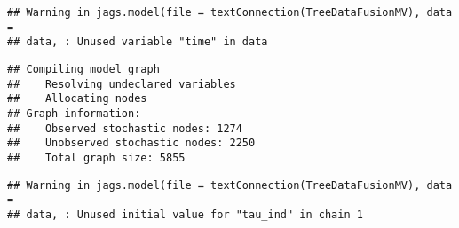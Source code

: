 \documentclass[]{article}
\newenvironment{Shaded}{\begin{snugshade}}{\end{snugshade}}
\newcommand{\CommentTok}[1]{\textcolor[rgb]{0.56,0.35,0.01}{\textit{#1}}}
\newcommand{\ControlFlowTok}[1]{\textcolor[rgb]{0.13,0.29,0.53}{\textbf{#1}}}
\newcommand{\DataTypeTok}[1]{\textcolor[rgb]{0.13,0.29,0.53}{#1}}
\newcommand{\DecValTok}[1]{\textcolor[rgb]{0.00,0.00,0.81}{#1}}
\newcommand{\KeywordTok}[1]{\textcolor[rgb]{0.13,0.29,0.53}{\textbf{#1}}}
\newcommand{\NormalTok}[1]{#1}
\newcommand{\OperatorTok}[1]{\textcolor[rgb]{0.81,0.36,0.00}{\textbf{#1}}}
\newcommand{\OtherTok}[1]{\textcolor[rgb]{0.56,0.35,0.01}{#1}}
\newcommand{\StringTok}[1]{\textcolor[rgb]{0.31,0.60,0.02}{#1}}
\begin{document}
\begin{Shaded}
\end{Shaded}

\begin{verbatim}
## Warning in jags.model(file = textConnection(TreeDataFusionMV), data =
## data, : Unused variable "time" in data
\end{verbatim}

\begin{verbatim}
## Compiling model graph
##    Resolving undeclared variables
##    Allocating nodes
## Graph information:
##    Observed stochastic nodes: 1274
##    Unobserved stochastic nodes: 2250
##    Total graph size: 5855
\end{verbatim}

\begin{verbatim}
## Warning in jags.model(file = textConnection(TreeDataFusionMV), data =
## data, : Unused initial value for "tau_ind" in chain 1
\end{verbatim}
\end{document}
